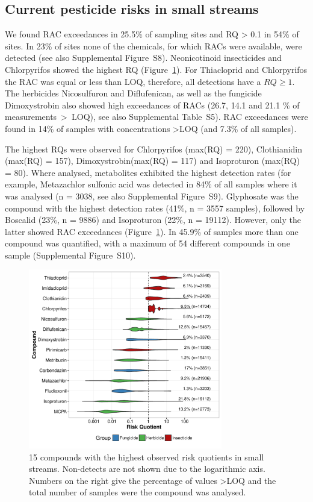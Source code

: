 \documentclass[journal=esthag,manuscript=article]{achemso}
\begin{document}
\subsection{Current pesticide risks in small streams}
We found RAC exceedances in 25.5\% of sampling sites and RQ > 0.1 in 54\% of sites. 
In 23\% of sites none of the chemicals, for which RACs were available, were detected (see also Supplemental Figure~S8).
Neonicotinoid insecticides and Chlorpyrifos showed the highest RQ (Figure~\ref{fig:fig6}). %
For Thiacloprid and Chlorpyrifos the RAC was equal or less than LOQ, therefore, all detections have a $RQ \ge 1$. 
The herbicides Nicosulfuron and Diflufenican, as well as the fungicide Dimoxystrobin also showed high exceedances of RACs (26.7, 14.1 and 21.1 \% of measurements~\textgreater~LOQ), see also Supplemental Table~S5).
RAC exceedances were found in 14\% of samples with concentrations \textgreater LOQ (and 7.3\% of all samples).

The highest RQs were observed for Chlorpyrifos (max(RQ) = 220), Clothianidin (max(RQ) = 157), Dimoxystrobin(max(RQ) = 117) and Isoproturon (max(RQ) = 80). 
Where analysed, metabolites exhibited the highest detection rates (for example, Metazachlor sulfonic acid was detected in 84\% of all samples where it was analysed (n = 3038, see also Supplemental Figure~S9).
Glyphosate was the compound with the highest detection rates (41\%, n = 3557 samples), followed by Boscalid (23\%, n = 9886) and Isoproturon (22\%, n = 19112). 
However, only the latter showed RAC exceedances (Figure~\ref{fig:fig6}).
In 45.9\% of samples more than one compound was quantified, with a maximum of 54 different compounds in one sample (Supplemental Figure~S10). 

\begin{figure}[ht]
  \includegraphics[width=3.33in]{figure6.pdf}
  \caption{15 compounds with the highest observed risk quotients in small streams. Non-detects are not shown due to the logarithmic axis. Numbers on the right give the percentage of values \textgreater LOQ and the total number of samples were the compound was analysed.
  }
  \label{fig:fig6}
\end{figure}
\end{document}
